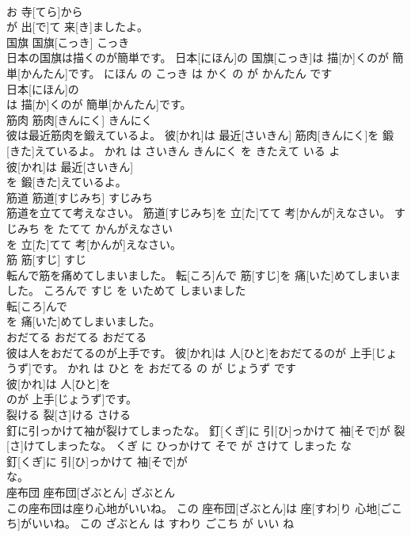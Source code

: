 \documentclass[8pt]{extreport}
\begin{document}
\begin{CJK}{UTF8}{min}
\\	お 寺[てら]から
\\	が 出[で]て 来[き]ましたよ。			
\\	国旗	国旗[こっき]	こっき	
\\	日本の国旗は描くのが簡単です。	日本[にほん]の 国旗[こっき]は 描[か]くのが 簡単[かんたん]です。	にほん の こっき は かく の が かんたん です	
\\	日本[にほん]の
\\	は 描[か]くのが 簡単[かんたん]です。			
\\	筋肉	筋肉[きんにく]	きんにく	
\\	彼は最近筋肉を鍛えているよ。	彼[かれ]は 最近[さいきん] 筋肉[きんにく]を 鍛[きた]えているよ。	かれ は さいきん きんにく を きたえて いる よ	
\\	彼[かれ]は 最近[さいきん]
\\	を 鍛[きた]えているよ。			
\\	筋道	筋道[すじみち]	すじみち	
\\	筋道を立てて考えなさい。	筋道[すじみち]を 立[た]てて 考[かんが]えなさい。	すじみち を たてて かんがえなさい	
\\	を 立[た]てて 考[かんが]えなさい。			
\\	筋	筋[すじ]	すじ	
\\	転んで筋を痛めてしまいました。	転[ころ]んで 筋[すじ]を 痛[いた]めてしまいました。	ころんで すじ を いためて しまいました	
\\	転[ころ]んで
\\	を 痛[いた]めてしまいました。			
\\	おだてる	おだてる	おだてる	
\\	彼は人をおだてるのが上手です。	彼[かれ]は 人[ひと]をおだてるのが 上手[じょうず]です。	かれ は ひと を おだてる の が じょうず です	
\\	彼[かれ]は 人[ひと]を
\\	のが 上手[じょうず]です。			
\\	裂ける	裂[さ]ける	さける	
\\	釘に引っかけて袖が裂けてしまったな。	釘[くぎ]に 引[ひ]っかけて 袖[そで]が 裂[さ]けてしまったな。	くぎ に ひっかけて そで が さけて しまった な	
\\	釘[くぎ]に 引[ひ]っかけて 袖[そで]が
\\	な。			
\\	座布団	座布団[ざぶとん]	ざぶとん	
\\	この座布団は座り心地がいいね。	この 座布団[ざぶとん]は 座[すわ]り 心地[ごこち]がいいね。	この ざぶとん は すわり ごこち が いい ね	

\end{CJK}
\end{document}
